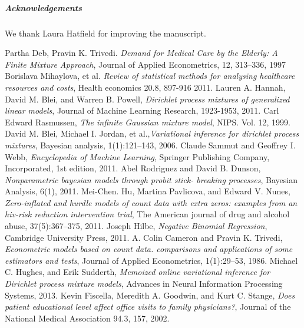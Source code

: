 \documentclass[a4paper,UKenglish]{oasics-v2016}
\begin{document}
\subparagraph*{Acknowledgements}

We thank Laura Hatfield for improving the manuscript.

\appendix





%



\begin{thebibliography}{50}
 Partha Deb, Pravin K. Trivedi. \textsl{Demand for Medical Care by the Elderly: A Finite Mixture
Approach}, Journal of Applied Econometrics, 12, 313–336, 1997
 Borislava Mihaylova, et al. \textsl{Review of statistical methods for analysing healthcare resources and costs}, Health economics 20.8, 897-916 2011.
Lauren A. Hannah, David M. Blei, and Warren B. Powell, \textsl{Dirichlet process mixtures of generalized linear models}, Journal of Machine Learning Research, 1923-1953, 2011.
 Carl Edward Rasmussen, \textsl{The infinite Gaussian mixture model}, NIPS. Vol. 12, 1999.
 David M. Blei, Michael I. Jordan, et al.,\textsl{Variational inference for dirichlet process mixtures}, Bayesian
analysis, 1(1):121–143, 2006.
 Claude Sammut and Geoffrey I. Webb, \textsl{Encyclopedia of Machine Learning}, Springer Publishing
Company, Incorporated, 1st edition, 2011.
 Abel Rodriguez and David B. Dunson, \textsl{Nonparametric bayesian models through probit stick-
breaking processes}, Bayesian Analysis, 6(1), 2011.
 Mei-Chen. Hu, Martina Pavlicova, and Edward V. Nunes, \textsl{Zero-inflated and hurdle models of count data
with extra zeros: examples from an hiv-risk reduction intervention trial}, The American
journal of drug and alcohol abuse, 37(5):367–375, 2011.
 Joseph Hilbe, \textsl{Negative Binomial Regression}, Cambridge University Press, 2011.
 A. Colin Cameron and Pravin K. Trivedi, \textsl{Econometric models based on count data. comparisons
and applications of some estimators and tests}, Journal of Applied Econometrics, 1(1):29–53,
1986.
 Michael C. Hughes, and Erik Sudderth, \textsl{Memoized online variational inference for Dirichlet process mixture models}, Advances in Neural Information Processing Systems, 2013.
 Kevin Fiscella, Meredith A. Goodwin, and Kurt C. Stange, \textsl{Does patient educational level affect office visits to family physicians?}, Journal of the National Medical Association 94.3, 157, 2002.
\end{thebibliography}
\end{document}
